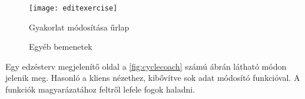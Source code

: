 \begin{figure}[H]
	\centering
	\texttt{[image: editexercise]}
	\caption{Gyakorlat módosítása űrlap}
	\label{fig:editexercise}
\end{figure}

\begin{figure}[H]
	\centering
	\hspace{5pt}
	\caption{Egyéb bemenetek}
	\label{fig:addrexercise}
\end{figure}



Egy edzésterv megjelenítő oldal a \ref{fig:cyclecoach} számú ábrán látható módon jelenik meg. Hasonló a kliens nézethez, kibővítve sok adat módosító funkcióval. A funkciók magyarázatához feltről lefele fogok haladni.

